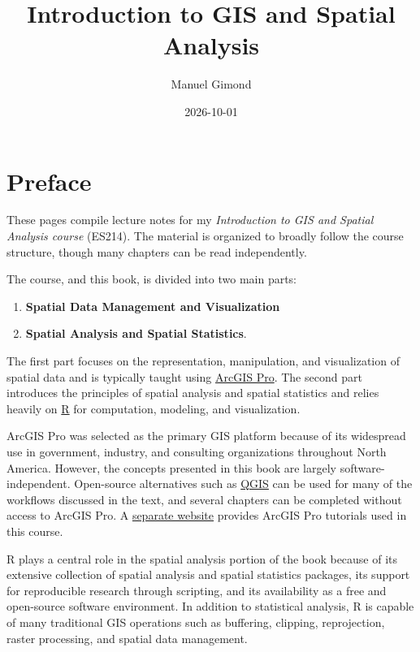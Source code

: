 \documentclass[
  letterpaper,
]{book}
\title{Introduction to GIS and Spatial Analysis}
\author{Manuel Gimond}
\date{2026-10-01}
\providecommand{\tightlist}{%
  \setlength{\itemsep}{0pt}\setlength{\parskip}{0pt}}
\renewcommand*\contentsname{Table of contents}
\newcommand\contentsname{Table of contents}
\begin{document}
\frontmatter
\maketitle

\renewcommand*\contentsname{Table of contents}
{
\setcounter{tocdepth}{2}
\tableofcontents
}

\mainmatter
{}

\chapter*{Preface}\label{preface}


These pages compile lecture notes for my \emph{Introduction to GIS and
Spatial Analysis course} (ES214). The material is organized to broadly
follow the course structure, though many chapters can be read
independently.

The course, and this book, is divided into two main parts:

\begin{enumerate}
\def\labelenumi{\arabic{enumi}.}
\tightlist
\item
  \textbf{Spatial Data Management and Visualization}
\item
  \textbf{Spatial Analysis and Spatial Statistics}.
\end{enumerate}

The first part focuses on the representation, manipulation, and
visualization of spatial data and is typically taught using
\href{https://www.esri.com/en-us/arcgis/products/arcgis-pro/overview}{ArcGIS
Pro}. The second part introduces the principles of spatial analysis and
spatial statistics and relies heavily on
\href{https://www.r-project.org/}{R} for computation, modeling, and
visualization.

ArcGIS Pro was selected as the primary GIS platform because of its
widespread use in government, industry, and consulting organizations
throughout North America. However, the concepts presented in this book
are largely software-independent. Open-source alternatives such as
\href{http://qgis.org}{QGIS} can be used for many of the workflows
discussed in the text, and several chapters can be completed without
access to ArcGIS Pro. A
\href{https://sites.google.com/colby.edu/mgimond-arcgis-pro/}{separate
website} provides ArcGIS Pro tutorials used in this course.

R plays a central role in the spatial analysis portion of the book
because of its extensive collection of spatial analysis and spatial
statistics packages, its support for reproducible research through
scripting, and its availability as a free and open-source software
environment. In addition to statistical analysis, R is capable of many
traditional GIS operations such as buffering, clipping, reprojection,
raster processing, and spatial data management.
\end{document}
